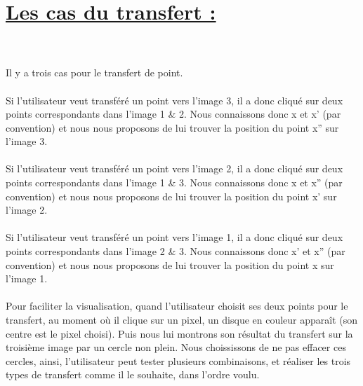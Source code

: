 \documentclass[a4paper,11pt,fleqn]{report}
\begin{document}
\section{\underline{Les cas du transfert :}}
\\\\
	Il y a trois cas pour le transfert de point.
	\\\\Si l'utilisateur veut transf\'er\'e un point vers l'image 3, il a donc cliqu\'e sur deux points correspondants dans l'image 1 & 2. Nous connaissons donc x et x' (par convention) et nous nous proposons de lui trouver la position du point x'' sur l'image 3.
	\\\\Si l'utilisateur veut transf\'er\'e un point vers l'image 2, il a donc cliqu\'e sur deux points correspondants dans l'image 1 & 3. Nous connaissons donc x et x'' (par convention) et nous nous proposons de lui trouver la position du point x' sur l'image 2.
	\\\\Si l'utilisateur veut transf\'er\'e un point vers l'image 1, il a donc cliqu\'e sur deux points correspondants dans l'image 2 & 3. Nous connaissons donc x' et x'' (par convention) et nous nous proposons de lui trouver la position du point x sur l'image 1.
	\\\\
	Pour faciliter la visualisation, quand l'utilisateur choisit ses deux points pour le transfert, au moment o\`u il clique sur un pixel, un disque en couleur appara\^it (son centre est le pixel choisi). Puis nous lui montrons son r\'esultat du transfert sur la troisi\`eme image par un cercle non plein. Nous choississons de ne pas effacer ces cercles, ainsi, l'utilisateur peut tester plusieurs combinaisons, et r\'ealiser les trois types de transfert comme il le souhaite, dans l'ordre voulu.
\\\\
\end{document}
